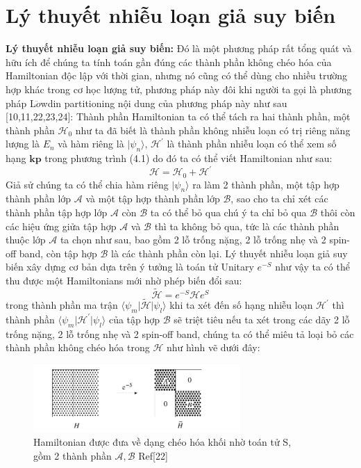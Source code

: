   \section{Lý thuyết nhiễu loạn giả suy biến}
  \textbf{Lý thuyết nhiễu loạn giả suy biến:} Đó là một phương pháp rất tổng quát và hữu ích để chúng ta tính toán gần đúng các thành phần không chéo hóa của Hamiltonian độc lập với thời gian, nhưng nó cũng có thể dùng cho nhiều trường hợp khác trong cơ học lượng tử, phương pháp này đôi khi người ta gọi là phương pháp L$\ddot{o}$wdin partitioning nội dung của phương pháp này như sau [10,11,22,23,24]:
  Thành phần Hamiltonian ta có thể tách ra hai thành phần, một thành phần $\mathcal{H}_0$ như ta đã biết là thành phần không nhiễu loạn có trị riêng năng lượng là $E_n$ và hàm riêng là $\vert \psi_n\rangle$, $\mathcal{H}^{'}$ là thành phần nhiễu loạn có thể xem số hạng $\mathbf{kp}$ trong phương trình (4.1) do đó ta có thể viết Hamiltonian như sau:
  \begin{equation}
  \mathcal{H} =\mathcal{H}_0 +\mathcal{H}^{'}
  \end{equation}
  Giả sử chúng ta có thể chia hàm riêng $\vert\psi_n\rangle$ ra làm 2 thành phần, một tập hợp thành phần lớp $\mathcal{A}$ và một tập hợp thành phần lớp $\mathcal{B}$, sao cho ta chỉ xét các thành phần tập hợp lớp $\mathcal{A}$ còn $\mathcal{B}$ ta có thể  bỏ qua chú ý ta chỉ bỏ qua $\mathcal{B}$ thôi còn các hiệu ứng giửa tập hợp $\mathcal{A}$ và $\mathcal{B}$ thì ta không bỏ qua, tức là các thành phần thuộc lớp $\mathcal{A}$ ta chọn như sau, bao gồm 2 lỗ trống nặng, 2 lỗ trống nhẹ và 2 spin-off band, còn tập hợp $\mathcal{B}$ là các thành phần còn lại.
  Lý thuyết nhiễu loạn giả suy biến xây dựng cơ bản dựa trên ý tưởng là toán tử Unitary $e^{-S}$ như vậy ta có thể thu được một Hamiltonians mới nhờ phép biến đổi sau:
  \begin{equation}
  \tilde{\mathcal{H}} =e^{-S}\mathcal{H}e^{S}
  \end{equation}
  trong thành phần ma trận $\langle\psi_m\vert \tilde{\mathcal{H}} \vert \psi_l\rangle$ khi ta xét đến số hạng nhiễu loạn $\mathcal{H}^{'}$ thì thành phần $\langle\psi_m\vert \mathcal{H}^{'} \vert \psi_l\rangle$ của tập hợp $\mathcal{B}$ sẽ triệt tiêu nếu ta xét trong các dãy  2 lỗ trống nặng, 2 lỗ trống nhẹ và 2 spin-off band, chúng ta có thể miêu tả loại bỏ các thành phần không chéo hóa trong $\mathcal{H}$ như hình vẽ dưới đây:
  \begin{figure}[hc]
  \centering
  \includegraphics[width=0.70\textwidth]{./Figures/lowd.png}
  \caption[Removal of off-diagonal elements of H]{Hamiltonian được đưa về dạng chéo hóa khối nhờ toán tử S,\\ gồm 2 thành phần $\mathcal{A},\mathcal{B}$ Ref[22]}
  \label{fig:Removal of off-diagonal elements of H}
  \end{figure}
